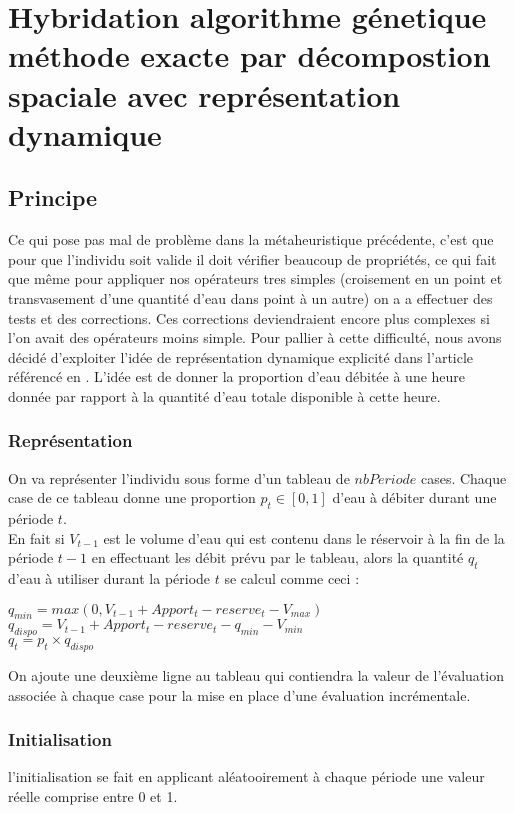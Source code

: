 \documentclass[a4paper]{report}
\begin{document}
\section{Hybridation algorithme génetique méthode exacte par décompostion spaciale avec représentation dynamique}
\subsection{Principe}
Ce qui pose pas mal de problème dans la métaheuristique précédente, c'est que pour que l'individu soit valide il doit vérifier beaucoup de propriétés, ce qui fait que même pour appliquer nos opérateurs tres simples (croisement en un point et transvasement d'une quantité d'eau dans point à un autre) on a a effectuer des tests et des corrections. Ces corrections deviendraient encore plus complexes si l'on avait des opérateurs moins simple. Pour pallier à cette difficulté, nous avons décidé d'exploiter l'idée de représentation dynamique explicité dans l'article référencé en . L'idée est de donner la proportion d'eau débitée à une heure donnée par rapport à la quantité d'eau totale disponible à cette heure. 

\subsubsection*{Représentation}
On va représenter l'individu sous forme d'un tableau de $nbPeriode$ cases. 
Chaque case de ce tableau donne une proportion $p_t \in [0,1]$ d'eau à débiter durant une période $t$.\\
En fait si $V_{t-1}$ est le volume d'eau qui  est contenu dans le réservoir à la fin de la période $t-1 $ en effectuant les débit prévu par le tableau, alors la quantité $q_t$ d'eau à utiliser durant la période $t$ se calcul comme ceci :\\
 \begin{center}
   $q_{min}=max(0, V_{t-1}+Apport_t-reserve_t -V_{max})$\\
   $q_{dispo}=  V_{t-1}+Apport_t-reserve_t -q_{min} -V_{min}$\\
   $q_t= p_t \times q_{dispo}$
 \end{center}
 On ajoute une deuxième ligne au tableau qui contiendra la valeur de l'évaluation associée à chaque case pour la mise en place d'une évaluation incrémentale.
 \subsubsection*{Initialisation}
 l'initialisation se fait en applicant aléatooirement à chaque période une valeur réelle comprise entre 0 et 1.
\end{document}
